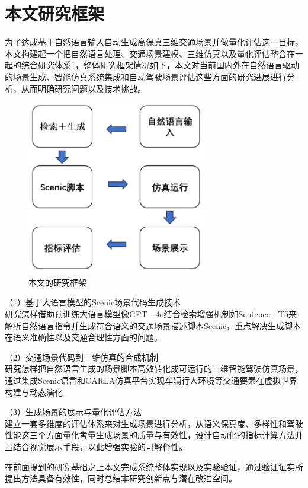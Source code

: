 \section{本文研究框架}

为了达成基于自然语言输入自动生成高保真三维交通场景并做量化评估这一目标，本文构建起一个把自然语言处理、交通场景建模\cite{du2025scene}、三维仿真以及量化评估整合在一起的综合研究体系\ref{fig:research_framework}，整体研究框架情况如下，本文对当前国内外在自然语言驱动的场景生成、智能仿真系统集成和自动驾驶场景评估这些方面的研究进展进行分析，从而明确研究问题以及技术挑战。
\begin{figure}[H]
	\centering
	\includegraphics[width=0.7\textwidth]{../images/研究架构图.pdf} 
	\caption{本文的研究框架}
	\label{fig:research_framework}
\end{figure}


	（1）基于大语言模型的Scenic场景代码生成技术 \\
研究怎样借助预训练大语言模型像GPT - 4o结合检索增强机制如Sentence - T5来解析自然语言指令并生成符合语义的交通场景描述脚本Scenic，重点解决生成脚本在语义准确性以及交通合理性方面的问题。
	
	（2）交通场景代码到三维仿真的合成机制 \\
研究怎样把自然语言生成的场景脚本高效转化成可运行的三维智能驾驶仿真场景，通过集成Scenic语言和CARLA仿真平台实现车辆行人环境等交通要素在虚拟世界构建与动态演化
	
	（3）生成场景的展示与量化评估方法 \\
建立一套多维度的评估体系来对生成场景进行分析，从语义保真度、多样性和驾驶性能这三个方面量化考量生成场景的质量与有效性，设计自动化的指标计算方法并且结合视觉展示手段，以此增强实验的可解释性。


在前面提到的研究基础之上本文完成系统整体实现以及实验验证，通过验证证实所提出方法具备有效性，同时总结本研究创新点与潜在改进空间。
